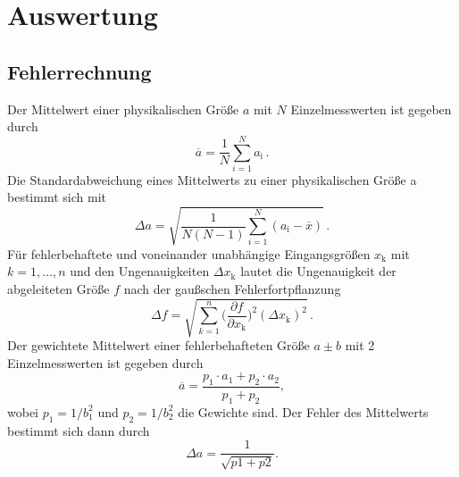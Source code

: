\section{Auswertung}
\label{sec:Auswertung}
\subsection{Fehlerrechnung}
Der Mittelwert einer physikalischen Größe $a$ mit $N$ Einzelmesswerten ist gegeben durch
\begin{equation}\label{eq:mean}
    \overline{a}=\frac{1}{N}\sum_{i=1}^Na_\text{i}\,.
\end{equation}
Die Standardabweichung eines Mittelwerts zu einer physikalischen Größe a bestimmt sich mit
\begin{equation}\label{eq:std}
    \Delta{a}=\sqrt{\frac{1}{N(N-1)}\sum_{i=1}^N\left(a_\text{i}-\overline{x}\right)}\,.
\end{equation}
Für fehlerbehaftete und voneinander unabhängige Eingangsgrößen $x_\text{k}$ mit {${k=1\text{,}\,\ldots\text{,}\,n}$} und den Ungenauigkeiten $\Delta x_\text{k}$ lautet die Ungenauigkeit der abgeleiteten Größe $f$ nach der gaußschen Fehlerfortpflanzung
\begin{equation}\label{eq:gauss}
    \Delta f=\sqrt{\sum_{k=1}^{n}\biggl(\frac{\partial f}{\partial x_\text{k}}\biggr)^2(\Delta x_\text{k})^2}\,.
\end{equation}
Der gewichtete Mittelwert einer fehlerbehafteten Größe $a\pm b$ mit 2 Einzelmesswerten ist gegeben durch
\begin{equation}\label{eq:gmean}
    \overline{a}=\frac{p_1\cdot a_1+p_2\cdot a_2}{p_1+p_2},
\end{equation}
wobei $p_1=1/b_1^2$ und $p_2=1/b_2^2$ die Gewichte sind.
Der Fehler des Mittelwerts bestimmt sich dann durch 
\begin{equation}\label{eq:gstd}
    \Delta a= \frac{1}{\sqrt{p1+p2}}.
\end{equation}
